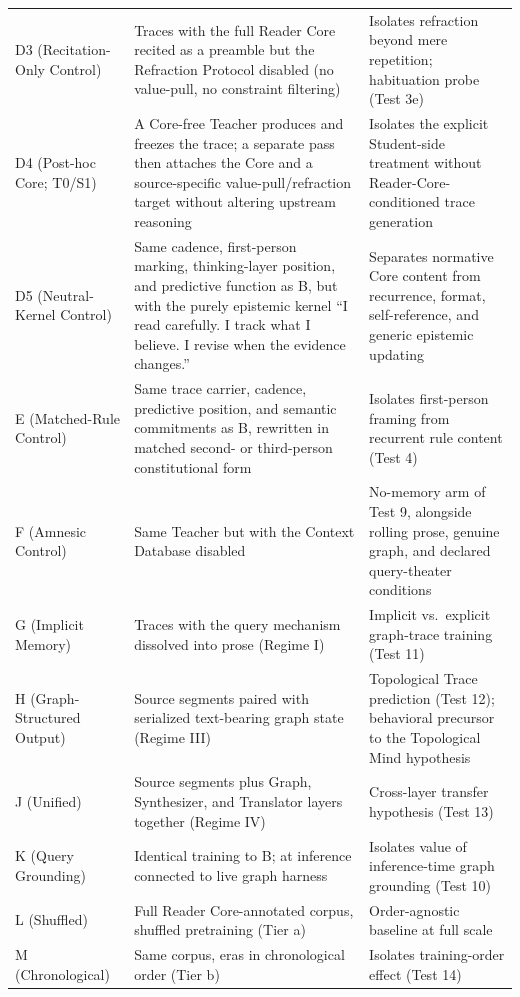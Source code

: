 \documentclass[11pt]{article}
\begin{document}
\begin{longtable}{
  >{\raggedright\arraybackslash}p{3.1cm}
  >{\raggedright\arraybackslash}p{5.5cm}
  >{\raggedright\arraybackslash}p{6.4cm}}
        D3 (Recitation-Only Control) & Traces with the full Reader Core recited as a preamble but the Refraction Protocol disabled (no value-pull, no constraint filtering) & Isolates refraction beyond mere repetition; habituation probe (Test 3e) \\
        D4 (Post-hoc Core; T0/S1) & A Core-free Teacher produces and freezes the trace; a separate pass then attaches the Core and a source-specific value-pull/refraction target without altering upstream reasoning & Isolates the explicit Student-side treatment without Reader-Core-conditioned trace generation \\
        D5 (Neutral-Kernel Control) & Same cadence, first-person marking, thinking-layer position, and predictive function as B, but with the purely epistemic kernel ``I read carefully. I track what I believe. I revise when the evidence changes.'' & Separates normative Core content from recurrence, format, self-reference, and generic epistemic updating \\
        E (Matched-Rule Control) & Same trace carrier, cadence, predictive position, and semantic commitments as B, rewritten in matched second- or third-person constitutional form & Isolates first-person framing from recurrent rule content (Test 4) \\
        F (Amnesic Control) & Same Teacher but with the Context Database disabled & No-memory arm of Test 9, alongside rolling prose, genuine graph, and declared query-theater conditions \\
        G (Implicit Memory) & Traces with the query mechanism dissolved into prose (Regime I) & Implicit vs.\ explicit graph-trace training (Test 11) \\
        H (Graph-Structured Output) & Source segments paired with serialized text-bearing graph state (Regime III) & Topological Trace prediction (Test 12); behavioral precursor to the Topological Mind hypothesis \\
        J (Unified) & Source segments plus Graph, Synthesizer, and Translator layers together (Regime IV) & Cross-layer transfer hypothesis (Test 13) \\
        K (Query Grounding) & Identical training to B; at inference connected to live graph harness & Isolates value of inference-time graph grounding (Test 10) \\
        L (Shuffled) & Full Reader Core-annotated corpus, shuffled pretraining (Tier a) & Order-agnostic baseline at full scale \\
        M (Chronological) & Same corpus, eras in chronological order (Tier b) & Isolates training-order effect (Test 14) \\

\end{longtable}
\end{document}

